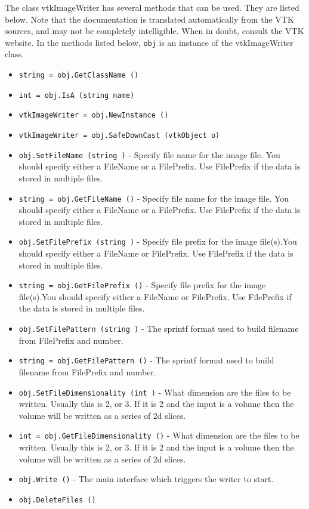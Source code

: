 The class vtkImageWriter has several methods that can be used.
  They are listed below.
Note that the documentation is translated automatically from the VTK sources,
and may not be completely intelligible.  When in doubt, consult the VTK website.
In the methods listed below, \verb|obj| is an instance of the vtkImageWriter class.
\begin{itemize}
\item  \verb|string = obj.GetClassName ()|

\item  \verb|int = obj.IsA (string name)|

\item  \verb|vtkImageWriter = obj.NewInstance ()|

\item  \verb|vtkImageWriter = obj.SafeDownCast (vtkObject o)|

\item  \verb|obj.SetFileName (string )| -  Specify file name for the image file. You should specify either
 a FileName or a FilePrefix. Use FilePrefix if the data is stored 
 in multiple files.

\item  \verb|string = obj.GetFileName ()| -  Specify file name for the image file. You should specify either
 a FileName or a FilePrefix. Use FilePrefix if the data is stored 
 in multiple files.

\item  \verb|obj.SetFilePrefix (string )| -  Specify file prefix for the image file(s).You should specify either
 a FileName or FilePrefix. Use FilePrefix if the data is stored
 in multiple files.

\item  \verb|string = obj.GetFilePrefix ()| -  Specify file prefix for the image file(s).You should specify either
 a FileName or FilePrefix. Use FilePrefix if the data is stored
 in multiple files.

\item  \verb|obj.SetFilePattern (string )| -  The sprintf format used to build filename from FilePrefix and number.

\item  \verb|string = obj.GetFilePattern ()| -  The sprintf format used to build filename from FilePrefix and number.

\item  \verb|obj.SetFileDimensionality (int )| -  What dimension are the files to be written. Usually this is 2, or 3.
 If it is 2 and the input is a volume then the volume will be 
 written as a series of 2d slices.

\item  \verb|int = obj.GetFileDimensionality ()| -  What dimension are the files to be written. Usually this is 2, or 3.
 If it is 2 and the input is a volume then the volume will be 
 written as a series of 2d slices.

\item  \verb|obj.Write ()| -  The main interface which triggers the writer to start.

\item  \verb|obj.DeleteFiles ()|

\end{itemize}
